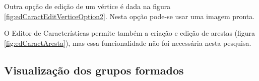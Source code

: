 Outra opção de edição de um vértice é dada na figura \ref{fig:edCaractEditVerticeOption2}. Nesta opção pode-se usar uma imagem pronta.
\begin{figure}[!ht]
	\centering	
\end{figure}
\FloatBarrier

O Editor de Características permite também a criação e edição de arestas (figura \ref{fig:edCaractAresta}), mas essa funcionalidade não foi necessária nesta pesquisa.
\begin{figure}[!ht]
	\centering	
\end{figure}
\FloatBarrier

\subsection{Visualização dos grupos formados}

